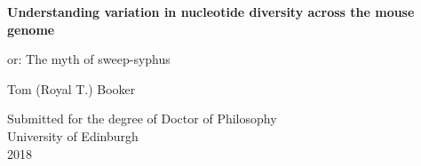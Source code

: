 \thispagestyle{empty}

\begin{minipage}{\textwidth}
\end{minipage}
\begin{center}
\vspace{2cm}
{ \Huge \textbf{Understanding variation in nucleotide diversity across the mouse genome}
  \par
  \vspace{2.5cm} 
{\Large or: The myth of sweep-syphus\par}

{\Large Tom (Royal T.) Booker \par}
}
\end{center}
\vfill
\begin{center}
\vspace{0.5cm}
{\Large Submitted for the degree of Doctor of Philosophy\\
University of Edinburgh\\
2018}
\end{center}

\newpage
\thispagestyle{empty}


